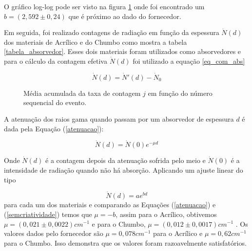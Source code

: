 \documentclass{article}
\begin{document}
O gráfico log-log pode ser visto na figura \ref{sem_abs} onde foi encontrado um $b = (2,592 \pm 0,24)$ que é próximo ao dado do fornecedor.

Em seguida, foi realizado contagens de radiação em função da espessura $\dot N(d)$ dos materiais de Acrílico e do Chumbo como mostra a tabela \ref{tabela_absorvedor}. Esses dois materiais foram utilizados como absorvedores e para o cálculo da contagem efetiva $\dot N(d)$ foi utilizado a equação \ref{eq_com_abs}

\begin{equation}
    \label{eq_com_abs}
    \dot N(d) = \dot N'(d) - \dot N _0
\end{equation}

\begin{figure}[H] %
    \centering
    \caption{Média acumulada da taxa de contagem $j$ em função do número sequencial do evento.}
    \label{sem_abs}
\end{figure}

A atenuação dos raios gama quando passam por um absorvedor de espessura $d$ é dada pela Equação (\ref{atenuacao}):

\begin{equation}
    \label{atenuacao}
    \dot N(d) = \dot N(0)e^{-\mu d}
\end{equation}

Onde $\dot N(d)$ é a contagem depois da atenuação sofrida pelo meio e $\dot N(0)$ é a intensidade de radiação quando não há absorção. Aplicando um ajuste linear do tipo

\begin{equation}
    \label{semcriatividade}
    \dot N(d) = ae^{bd}
\end{equation}
para cada um dos materiais e comparando as Equações (\ref{atenuacao}) e (\ref{semcriatividade}) temos que $\mu = −b$, assim para o Acrílico, obtivemos $\mu = (0,021 \pm 0,0022) cm ^{−1}$ e para o Chumbo, $\mu = (0,012 \pm 0,0017) cm ^{−1}$ . Os valores dados pelo fornecedor são $\mu = 0,078 cm ^{−1}$ para o Acrílico e $\mu = 0,62 cm ^{−1}$ para o Chumbo. Isso demonstra que os valores foram razoavelmente satisfatórios.
\end{document}
